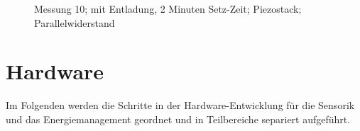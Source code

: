 \documentclass[12pt]{scrreprt} %
\begin{document}
\begin {figure}[htbp]
      \begin{center}
      \end{center}
\caption[Messung 10; 2 Minuten Setz-Zeit; Piezostack; Parallelwiderstand]{Messung 10; mit Entladung, 2 Minuten Setz-Zeit; Piezostack; Parallelwiderstand}
\label{fig:2.10}
\end{figure}
%
\chapter{Hardware}
Im Folgenden werden die Schritte in der Hardware-Entwicklung für die Sensorik und das Energiemanagement geordnet und in Teilbereiche separiert aufgeführt.
\end{document}
